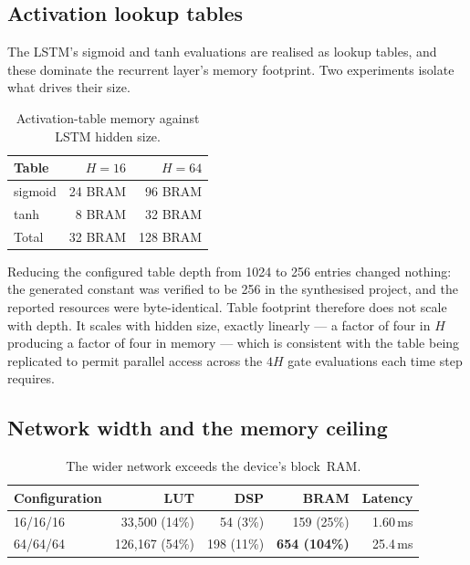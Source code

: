 \documentclass[11pt,a4paper]{article}
\begin{document}
\subsection{Activation lookup tables}
\label{sec:tables}

The LSTM's sigmoid and tanh evaluations are realised as lookup tables, and
these dominate the recurrent layer's memory footprint. Two experiments isolate
what drives their size.

\begin{table}[h]
\centering
\begin{tabular}{lrr}
\toprule
\textbf{Table} & \textbf{$H = 16$} & \textbf{$H = 64$} \\
\midrule
sigmoid & 24 BRAM & 96 BRAM \\
tanh    & 8 BRAM  & 32 BRAM \\
\midrule
Total   & 32 BRAM & 128 BRAM \\
\bottomrule
\end{tabular}
\caption{Activation-table memory against LSTM hidden size.}
\end{table}

Reducing the configured table depth from 1024 to 256 entries changed nothing:
the generated constant was verified to be 256 in the synthesised project, and
the reported resources were byte-identical. Table footprint therefore does not
scale with depth. It scales with hidden size, exactly linearly --- a factor of
four in $H$ producing a factor of four in memory --- which is consistent with
the table being replicated to permit parallel access across the $4H$ gate
evaluations each time step requires.

\subsection{Network width and the memory ceiling}
\label{sec:width}

\begin{table}[h]
\centering
\begin{tabular}{lrrrr}
\toprule
\textbf{Configuration} & \textbf{LUT} & \textbf{DSP} & \textbf{BRAM} & \textbf{Latency} \\
\midrule
16/16/16 & 33{,}500 (14\%)  & 54 (3\%)   & 159 (25\%)            & 1.60\,ms \\
64/64/64 & 126{,}167 (54\%) & 198 (11\%) & \textbf{654 (104\%)}  & 25.4\,ms \\
\bottomrule
\end{tabular}
\caption{The wider network exceeds the device's block~RAM.}
\end{table}
\end{document}
